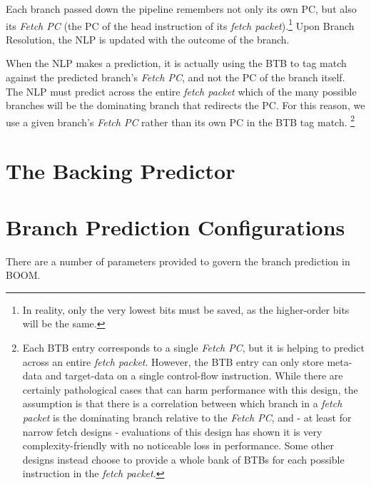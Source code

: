 Each branch passed down the pipeline remembers not only its own PC, but also its {\em Fetch PC} (the PC of the head instruction of its {\em fetch packet}).\footnote{In reality, only the very lowest bits must be saved, as the higher-order bits will be the same.}  Upon Branch Resolution, the NLP is updated with the outcome of the branch.  

When the NLP makes a prediction, it is actually using the BTB to tag match against the predicted branch's {\em Fetch PC}, and not the PC of the branch itself.  
The NLP must predict across the entire {\em fetch packet} which of the many possible branches will be the dominating branch that redirects the PC.  
For this reason, we use a given branch's {\em Fetch PC} rather than its own PC in the BTB tag match. %
\footnote{Each BTB entry corresponds to a single {\em Fetch PC}, but it is helping to predict across an entire {\em fetch packet}. However, the BTB entry can only store meta-data and target-data on a single control-flow instruction.  While there are certainly pathological cases that can harm performance with this design, the assumption is that there is a correlation between which branch in a {\em fetch packet} is the dominating branch relative to the {\em Fetch PC}, and - at least for narrow fetch designs - evaluations of this design has shown it is very complexity-friendly with no noticeable loss in performance. Some other designs instead choose to provide a whole bank of BTBs for each possible instruction in the {\em fetch packet}.} 





\section{The Backing Predictor}


\section{Branch Prediction Configurations}

There are a number of parameters provided to govern the branch prediction in BOOM.

 
